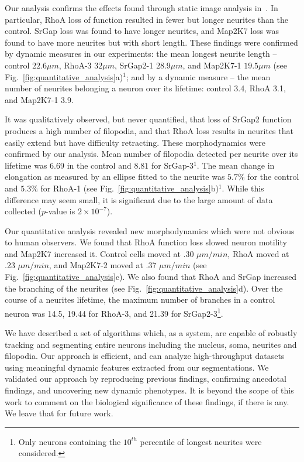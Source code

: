 \vspace{3mm}
 Our analysis confirms the effects found through static image
analysis  in~\cite{Pertz08}.  In  particular,  RhoA  loss  of  function
resulted in fewer but longer neurites than the control. SrGap loss was
found to have longer neurites, and  Map2K7 loss was found to have
more neurites but with short length.  These findings  were confirmed by dynamic measures in
our experiments: the mean longest  neurite length -- control $22.6 \mu
m$, RhoA-3 $32  \mu m$, SrGap2-1 $28.9 \mu m$,  and Map2K7-1 $19.5 \mu
m$  (see  Fig.~\ref{fig:quantitative_analysis}a)$^1$;  and  by  a  dynamic
measure --  the mean  number of neurites  belonging a neuron  over its
lifetime: control 3.4, RhoA 3.1, and Map2K7-1 3.9.

It  was qualitatively  observed, but  never quantified,  that  loss of
SrGap2 function  produces a  high number of  filopodia, and  that RhoA
loss  results  in neurites  that  easily  extend  but have  difficulty
retracting. These morphodynamics were  confirmed by our analysis. Mean
number of filopodia detected per  neurite over its lifetime was $6.69$
in the control  and $8.81$ for SrGap-3$^1$. The  mean change in elongation
as measured  by an ellipse fitted  to the neurite was  $5.7\%$ for the
control        and        $5.3\%$        for        RhoA-1        (see
Fig.~\ref{fig:quantitative_analysis}b)$^1$. While this difference may seem
small,  it is  significant due  to the  large amount  of  data collected
($p$-value is $2 \times 10^{-7}$).

Our quantitative analysis revealed new morphodynamics which
were not obvious to human  observers. We found that RhoA function loss
slowed  neuron motility and  Map2K7 increased  it.  Control cells
moved at  .30 $\mu  m / min$,  RhoA moved  at .23 $\mu  m /  min$, and
Map2K7-2     moved     at    .37     $\mu     m     /    min$     (see
Fig.~\ref{fig:quantitative_analysis}c).  We  also found that  RhoA and
SrGap  increased the  branching of  the
neurites (see Fig.~\ref{fig:quantitative_analysis}d).  Over the course
of a  neurites lifetime, the maximum  number of branches  in a control
neuron    was    14.5,   19.44    for    RhoA-3,    and   21.39    for
SrGap2-3\footnote{Only neurons containing  the  $10^{th}$  percentile  of
  longest neurites were considered.}.

\vspace{3mm}
 We have described a  set of algorithms
which, as a  system, are capable of robustly  tracking and segmenting entire
neurons  including  the nucleus,  soma,  neurites  and filopodia.  Our
approach is efficient, and  can analyze high-throughput datasets using
meaningful dynamic  features extracted from  our segmentations.
We  validated  our  approach  by  reproducing
previous findings,  confirming anecdotal findings,  and uncovering new
dynamic phenotypes. It is beyond the scope of this work to comment on
the biological significance of these findings, if there is any. We
leave that for future work.


